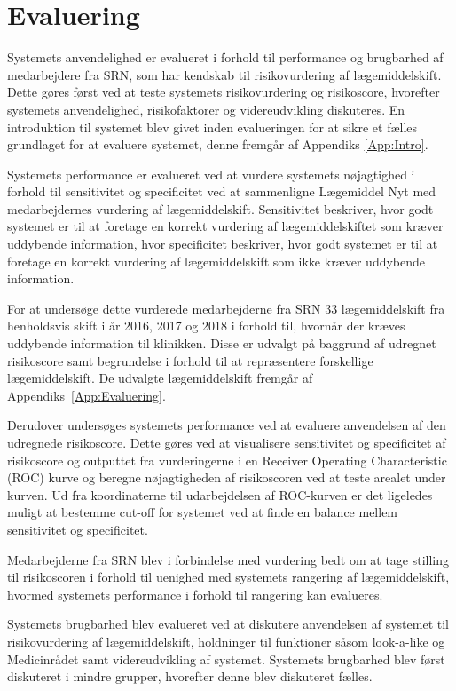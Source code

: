 \section{Evaluering}
Systemets anvendelighed er evalueret i forhold til performance og brugbarhed af medarbejdere fra SRN, som har kendskab til risikovurdering af lægemiddelskift. Dette gøres først ved at teste systemets risikovurdering og risikoscore, hvorefter systemets anvendelighed, risikofaktorer og videreudvikling diskuteres. En introduktion til systemet blev givet inden evalueringen for at sikre et fælles grundlaget for at evaluere systemet, denne fremgår af Appendiks \ref{App:Intro}. 

Systemets performance er evalueret ved at vurdere systemets nøjagtighed i forhold til sensitivitet og specificitet ved at sammenligne Lægemiddel Nyt med medarbejdernes vurdering af lægemiddelskift. Sensitivitet beskriver, hvor godt systemet er til at foretage en korrekt vurdering af lægemiddelskiftet som kræver uddybende information, hvor specificitet beskriver, hvor godt systemet er til at foretage en korrekt vurdering af lægemiddelskift som ikke kræver uddybende information.

For at undersøge dette vurderede medarbejderne fra SRN 33 lægemiddelskift fra henholdsvis skift i år 2016, 2017 og 2018 i forhold til, hvornår der kræves uddybende information til klinikken. Disse er udvalgt på baggrund af udregnet risikoscore samt begrundelse i forhold til at repræsentere forskellige lægemiddelskift. De udvalgte lægemiddelskift fremgår af Appendiks~\ref{App:Evaluering}. 

Derudover undersøges systemets performance ved at evaluere anvendelsen af den udregnede risikoscore. Dette gøres ved at visualisere sensitivitet og specificitet af risikoscore og outputtet fra vurderingerne i en Receiver Operating Characteristic (ROC) kurve og beregne nøjagtigheden af risikoscoren ved at teste arealet under kurven. Ud fra koordinaterne til udarbejdelsen af ROC-kurven er det ligeledes muligt at bestemme cut-off for systemet ved at finde en balance mellem sensitivitet og specificitet. 

Medarbejderne fra SRN blev i forbindelse med vurdering bedt om at tage stilling til risikoscoren i forhold til uenighed med systemets rangering af lægemiddelskift, hvormed systemets performance i forhold til rangering kan evalueres.

Systemets brugbarhed blev evalueret ved at diskutere anvendelsen af systemet til risikovurdering af lægemiddelskift, holdninger til funktioner såsom look-a-like og Medicinrådet samt videreudvikling af systemet. Systemets brugbarhed blev først diskuteret i mindre grupper, hvorefter denne blev diskuteret fælles.

